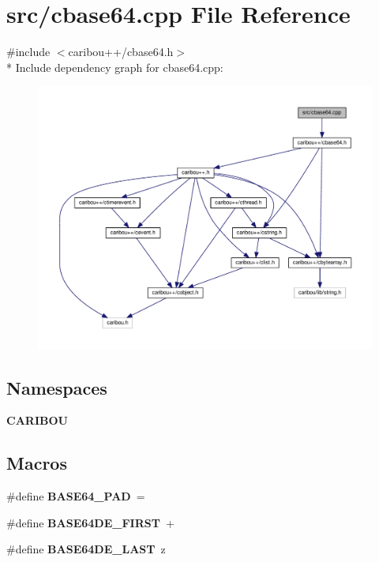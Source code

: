 \section{src/cbase64.cpp File Reference}
\label{cbase64_8cpp}
{\ttfamily \#include $<$caribou++/cbase64.\+h$>$}\\*
Include dependency graph for cbase64.\+cpp\+:
\nopagebreak
\begin{figure}[H]
\begin{center}
\leavevmode
\includegraphics[width=350pt]{cbase64_8cpp__incl}
\end{center}
\end{figure}
\subsection*{Namespaces}
\begin{DoxyCompactItemize}
\item 
 {\bf C\+A\+R\+I\+B\+OU}
\end{DoxyCompactItemize}
\subsection*{Macros}
\begin{DoxyCompactItemize}
\item 
\#define {\bf B\+A\+S\+E64\+\_\+\+P\+AD}~\textquotesingle{}=\textquotesingle{}
\item 
\#define {\bf B\+A\+S\+E64\+D\+E\+\_\+\+F\+I\+R\+ST}~\textquotesingle{}+\textquotesingle{}
\item 
\#define {\bf B\+A\+S\+E64\+D\+E\+\_\+\+L\+A\+ST}~\textquotesingle{}z\textquotesingle{}
\end{DoxyCompactItemize}


